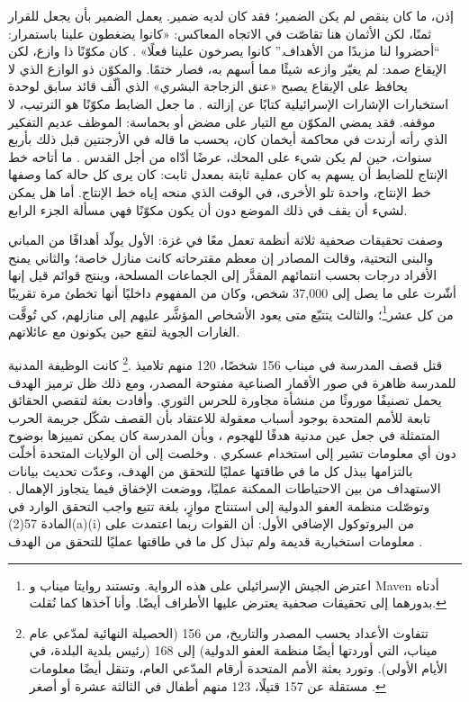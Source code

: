 إذن، ما كان ينقص لم يكن الضمير؛ فقد كان لديه ضمير. يعمل الضمير بأن يجعل للقرار ثمنًا، لكن الأثمان هنا تقاصّت في الاتجاه المعاكس: «كانوا يضغطون علينا باستمرار: “أحضروا لنا مزيدًا من الأهداف.” كانوا يصرخون علينا فعلًا» \autocite{abraham2024lavender}. كان مكوّنًا ذا وازع، لكن الإيقاع صمد: لم يغيّر وازعه شيئًا مما أسهم به، فصار ختمًا. والمكوّن ذو الوازع الذي لا يحافظ على الإيقاع يصبح «عنق الزجاجة البشري» الذي ألّف قائد سابق لوحدة استخبارات الإشارات الإسرائيلية كتابًا عن إزالته \autocite{ys2021humanmachine}. ما جعل الضابط مكوّنًا هو الترتيب، لا موقفه. فقد يمضي المكوّن مع التيار على مضض أو بحماسة: الموظف عديم التفكير الذي رأته أرندت في محاكمة أيخمان \autocite{arendt1963eichmann} كان، بحسب ما قاله في الأرجنتين قبل ذلك بأربع سنوات، حين لم يكن شيء على المحك، عرضًا أدّاه من أجل القدس \autocite{stangneth2014eichmann}. ما أتاحه خط الإنتاج للضابط أن يسهم به كان عملية ثابتة بمعدل ثابت: كان يرى كل حالة كما وصفها خط الإنتاج، واحدة تلو الأخرى، في الوقت الذي منحه إياه خط الإنتاج. أما هل يمكن لشيء أن يقف في ذلك الموضع دون أن يكون مكوّنًا فهي مسألة الجزء الرابع.

وصفت تحقيقات صحفية ثلاثة أنظمة تعمل معًا في غزة: الأول يولّد أهدافًا من المباني والبنى التحتية، وقالت المصادر إن معظم مقترحاته كانت منازل خاصة؛ والثاني يمنح الأفراد درجات بحسب انتمائهم المقدَّر إلى الجماعات المسلحة، وينتج قوائم قيل إنها أشّرت على ما يصل إلى 37,000 شخص، وكان من المفهوم داخليًا أنها تخطئ مرة تقريبًا من كل عشر\footnote{اعترض الجيش الإسرائيلي على هذه الرواية. وتستند روايتا ميناب و Maven أدناه بدورهما إلى تحقيقات صحفية يعترض عليها الأطراف أيضًا. وأنا آخذها كما نُقلت.}؛ والثالث يتتبّع متى يعود الأشخاص المؤشَّر عليهم إلى منازلهم، كي تُوقَّت الغارات الجوية لتقع حين يكونون مع عائلاتهم.


قتل قصف المدرسة في ميناب 156 شخصًا، 120 منهم تلاميذ \autocite[الفقرة~92]{UNFFMIran2026}.\footnote{تتفاوت الأعداد بحسب المصدر والتاريخ، من 156 (الحصيلة النهائية لمدّعي عام ميناب، التي أوردتها أيضًا منظمة العفو الدولية) إلى 168 (رئيس بلدية البلدة، في الأيام الأولى). وتورد بعثة الأمم المتحدة أرقام المدّعي العام، وتنقل أيضًا معلومات مستقلة عن 157 قتيلًا، 123 منهم أطفال في الثالثة عشرة أو أصغر \autocite[الفقرتان~92–93]{UNFFMIran2026}.} كانت الوظيفة المدنية للمدرسة ظاهرة في صور الأقمار الصناعية مفتوحة المصدر، ومع ذلك ظل ترميز الهدف يحمل تصنيفًا موروثًا من منشأة مجاورة للحرس الثوري. وأفادت بعثة لتقصي الحقائق تابعة للأمم المتحدة بوجود أسباب معقولة للاعتقاد بأن القصف شكّل جريمة الحرب المتمثلة في جعل عين مدنية هدفًا للهجوم \autocite{ohchr2026minabpress}، وبأن المدرسة كان يمكن تمييزها بوضوح دون أي معلومات تشير إلى استخدام عسكري \autocite[الفقرات~81–86، 124–126]{UNFFMIran2026}. وخلصت إلى أن الولايات المتحدة أخلّت بالتزامها ببذل كل ما في طاقتها عمليًا للتحقق من الهدف، وعدّت تحديث بيانات الاستهداف من بين الاحتياطات الممكنة عمليًا، ووضعت الإخفاق فيما يتجاوز الإهمال \autocite[الفقرتان~124–125]{UNFFMIran2026}. وتوصّلت منظمة العفو الدولية إلى استنتاج موازٍ، بلغة تتبع واجب التحقق الوارد في المادة 57(2)(a)(i) من البروتوكول الإضافي الأول: أن القوات ربما اعتمدت على معلومات استخبارية قديمة ولم تبذل كل ما في طاقتها عمليًا للتحقق من الهدف \autocite{Amnesty2026Minab}.

